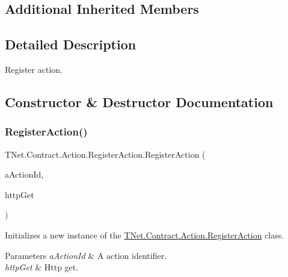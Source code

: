 \subsection*{Additional Inherited Members}


\subsection{Detailed Description}
Register action. 



\subsection{Constructor \& Destructor Documentation}
\mbox{\label{class_t_net_1_1_contract_1_1_action_1_1_register_action_ab61f9dd635690216354a4395230fa3ca}} 
\subsubsection{\texorpdfstring{Register\+Action()}{RegisterAction()}}
{\footnotesize\ttfamily T\+Net.\+Contract.\+Action.\+Register\+Action.\+Register\+Action (\begin{DoxyParamCaption}\item[{short}]{a\+Action\+Id,  }\item[{\mbox{\hyperlink{class_t_net_1_1_service_1_1_action_getter}{Action\+Getter}}}]{http\+Get }\end{DoxyParamCaption})\hspace{0.3cm}{\ttfamily [protected]}}



Initializes a new instance of the \mbox{\hyperlink{class_t_net_1_1_contract_1_1_action_1_1_register_action}{T\+Net.\+Contract.\+Action.\+Register\+Action}} class. 


\begin{DoxyParams}{Parameters}
{\em a\+Action\+Id} & A action identifier.\\
\hline
{\em http\+Get} & Http get.\\
\hline
\end{DoxyParams}


